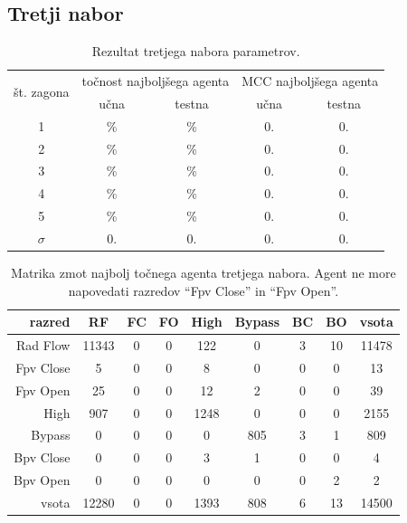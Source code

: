 \subsection{Tretji nabor}\label{subsec:dodatek-statlog-tretji-nabor}
\begin{table}[H]
    \begin{center}
        \begin{tabular}{|| c | c c || c c ||}
            \hline
            \multirow{2}{*}{št. zagona} & \multicolumn{2}{c||}{točnost najboljšega agenta} & \multicolumn{2}{c||}{MCC najboljšega agenta} \\ \cline{2-5}
            & učna & testna & učna & testna \\
            \hline
            1        & \%   & \%     & 0.   & 0.     \\
            \hline
            2        & \%   & \%     & 0.   & 0.     \\
            \hline
            3        & \%   & \%     & 0.   & 0.     \\
            \hline
            4        & \%   & \%     & 0.   & 0.     \\
            \hline
            5        & \%   & \%     & 0.   & 0.     \\
            \hline
            $\sigma$ & 0.   & 0.     & 0.   & 0.     \\
            \hline
        \end{tabular}
    \end{center}
    \caption{Rezultat tretjega nabora parametrov.}
    \label{tab:statlog_result_3}
\end{table}

\begin{table}[H]
    \centering
    \begin{tabular}{||rcccccccc||}
        \hline
        razred    & RF    & FC & FO & High & Bypass & BC & BO & vsota \\ \hline
        Rad Flow  & 11343 & 0  & 0  & 122  & 0      & 3  & 10 & 11478 \\ \hline
        Fpv Close & 5     & 0  & 0  & 8    & 0      & 0  & 0  & 13    \\ \hline
        Fpv Open  & 25    & 0  & 0  & 12   & 2      & 0  & 0  & 39    \\ \hline
        High      & 907   & 0  & 0  & 1248 & 0      & 0  & 0  & 2155  \\ \hline
        Bypass    & 0     & 0  & 0  & 0    & 805    & 3  & 1  & 809   \\ \hline
        Bpv Close & 0     & 0  & 0  & 3    & 1      & 0  & 0  & 4     \\ \hline
        Bpv Open  & 0     & 0  & 0  & 0    & 0      & 0  & 2  & 2     \\ \hline
        vsota     & 12280 & 0  & 0  & 1393 & 808    & 6  & 13 & 14500 \\ \hline
    \end{tabular}
    \caption{Matrika zmot najbolj točnega agenta tretjega nabora. Agent ne more napovedati razredov \enquote{Fpv Close} in \enquote{Fpv Open}.}
    \label{tab:statlog_acc_3}
\end{table}


